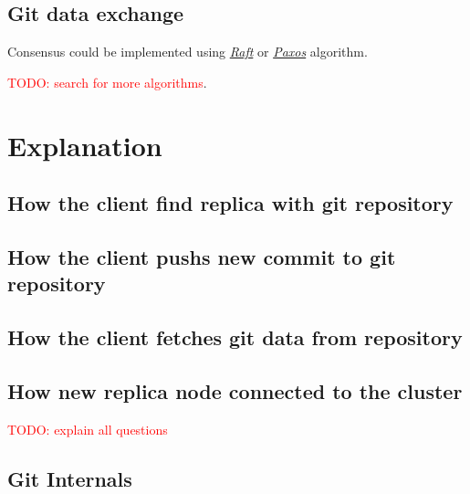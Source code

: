 \documentclass[12pt,oneside]{article}
\newcommand{\todo}[1]{\textcolor{red}{TODO: #1}}
\begin{document}
\subsection{Git data exchange}
\label{sec:data}
Consensus could be implemented using \emph{\href{https://raft.github.io/raft.pdf}{Raft}} or
\emph{\href{http://www.cs.yale.edu/homes/aspnes/pinewiki/Paxos.html}{Paxos}} algorithm.

\todo{search for more algorithms}.

\section{Explanation}

\subsection{How the client find replica with git repository}

\subsection{How the client pushs new commit to git repository}

\subsection{How the client fetches git data from repository}

\subsection{How new replica node connected to the cluster}

\todo{explain all questions}

\subsection{Git Internals}
\end{document}
